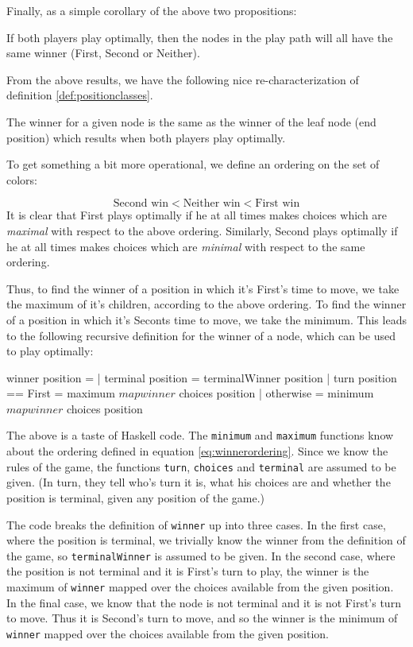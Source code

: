 Finally, as a simple corollary of the above two propositions:

\begin{proposition}
If both players play optimally, then the nodes in the play path will all have the same winner (First, Second or Neither).
\end{proposition}
From the above results, we have the following nice re-characterization of definition \ref{def:positionclasses}.

\begin{theorem}
The winner for a given node is the same as the winner of the leaf node (end position) which results when both players play optimally.
\end{theorem}
To get something a bit more operational, we define an ordering on the set of colors:

\begin{equation}
\label{eq:winnerordering}
  \text{Second win} < \text{Neither win} < \text{First win}
\end{equation}
It is clear that First plays optimally if he at all times makes choices which are \emph{maximal} with respect to the above ordering.
Similarly, Second plays optimally if he at all times makes choices which are \emph{minimal} with respect to the same ordering.

Thus, to find the winner of a position in which it's First's time to move, we take the maximum of it's children, according to the above ordering.
To find the winner of a position in which it's Seconts time to move, we take the minimum.
This leads to the following recursive definition for the winner of a node, which can be used to play optimally:

\begin{code}
  winner position =
    | terminal position      = terminalWinner position
    | turn position == First = maximum $ map winner $ choices position
    | otherwise              = minimum $ map winner $ choices position
\end{code}
The above is a taste of Haskell code.
The \texttt{minimum} and \texttt{maximum} functions know about the ordering defined in equation \ref{eq:winnerordering}.
Since we know the rules of the game, the functions \texttt{turn}, \texttt{choices} and \texttt{terminal} are assumed to be given.
(In turn, they tell who's turn it is, what his choices are and whether the position is terminal, given any position of the game.)

The code breaks the definition of \texttt{winner} up into three cases.
In the first case, where the position is terminal, we trivially know the winner from the definition of the game, so \texttt{terminalWinner} is assumed to be given.
In the second case, where the position is not terminal and it is First's turn to play, the winner is the maximum of \texttt{winner} mapped over the choices available from the given position.
In the final case, we know that the node is not terminal and it is not First's turn to move. Thus it is Second's turn to move, and so the winner is the minimum of \texttt{winner} mapped over the choices available from the given position.

